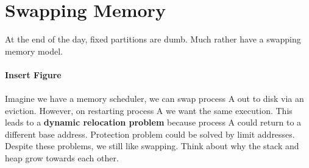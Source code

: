 \documentclass[../base_file/cs1550_notes.tex]{subfiles}
\begin{document}
\section{Swapping Memory}
At the end of the day, fixed partitions are dumb.  Much rather have a swapping memory model.\\\\
\textbf{Insert Figure}\\\\
Imagine we have a memory scheduler, we can swap process A out to disk via an eviction.  However,
on restarting process A we want the same execution.  This leads to a \textbf{dynamic relocation
problem} because process A could return to a different base address.  Protection problem could
be solved by limit addresses.  Despite these problems, we still like swapping.  Think about
why the stack and heap grow towards each other.
\end{document}
